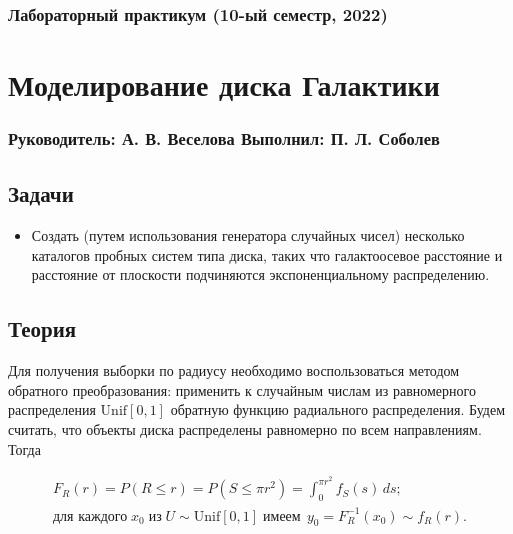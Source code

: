 \documentclass[a4paper, oneside]{article}
\newcommand{\su}{\vspace{-0.5em}}
\begin{document}
\subsubsection*{Лабораторный практикум (10-ый семестр, 2022)}
\section*{Моделирование диска Галактики}
\subsubsection*{Руководитель: А. В. Веселова \hspace{2em} Выполнил: П. Л. Соболев}

\vspace{3em}

\subsection*{Задачи}

\begin{itemize}
  \setlength\itemsep{-0.1em}
  \item Создать (путем использования генератора случайных чисел) несколько каталогов пробных систем типа диска, таких что галактоосевое расстояние и расстояние от плоскости подчиняются экспоненциальному распределению.
\end{itemize}

\subsection*{Теория}

Для получения выборки по радиусу необходимо воспользоваться методом обратного преобразования: применить к случайным числам из равномерного распределения $ \mathrm{Unif}[0, 1] $ обратную функцию радиального распределения. Будем считать, что объекты диска распределены равномерно по всем направлениям. Тогда

\su
\begin{equation}
\begin{gathered}
  F_R(r) = P(R \leqslant r) = P(S \leqslant \pi r^2) = \int_{0}^{\pi r^2} f_S(s) \, ds; \\
  \textit{для каждого} \; x_0 \; \textit{из} \; U \sim \mathrm{Unif}[0, 1] \; \textit{имеем} \;\, y_0 = F^{-1}_R(x_0) \sim f_R(r).
\end{gathered}
\end{equation}
\end{document}
